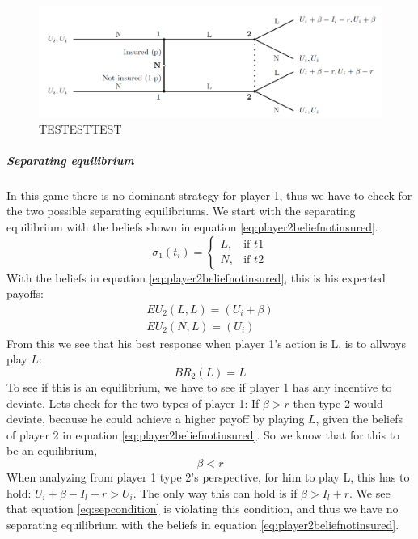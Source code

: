 \begin{figure}[h]
\centering

  \centering
\includegraphics[width=1\linewidth]{../Figures/SignalingGameNotInsured.png}

\caption{TESTESTTEST}

\end{figure}
\subparagraph{Separating equilibrium}
In this game there is no dominant strategy for player 1, thus we have to check for the two possible separating equilibriums.
We start with the separating equilibrium with the beliefs shown in equation \ref{eq:player2beliefnotinsured}.
\begin{equation}
    \sigma_{1}(t_{i})= 
\begin{cases}
   L,& \text{if } t1\\
   N,& \text{if } t2  
\end{cases}
\label{eq:player2beliefnotinsured}
\end{equation}
With the beliefs in equation \ref{eq:player2beliefnotinsured}, this is his expected payoffs:
\begin{eqnarray}
EU_{2}(L,L)=(U_{i}+\beta) \\
EU_{2}(N,L)=(U_{i})
\end{eqnarray}
From this we see that his best response when player 1's action is L, is to allways play $L$: \begin{equation}
BR_{2}(L)= L
\end{equation}
To see if this is an equilibrium, we have to see if player 1 has any incentive to deviate. 
Lets check for the two types of player 1:
If $\beta>r$ then type 2 would deviate, because he could achieve a higher payoff by playing $L$, given the beliefs of player 2 in equation \ref{eq:player2beliefnotinsured}. So we know that for this to be an equilibrium, \begin{equation}
\beta < r
\label{eq:sepcondition}
\end{equation}  
When analyzing from player 1 type 2's perspective, for him to play L, this has to hold: $U_{i}+\beta-I_{l}-r > U_{i}$. The only way this can hold is if $\beta>I_{l}+r$. We see that equation \ref{eq:sepcondition} is violating this condition, and thus we have no separating equilibrium with the beliefs in equation \ref{eq:player2beliefnotinsured}.
